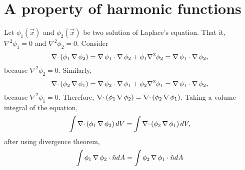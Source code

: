 \section{A property of harmonic functions}\label{c2sa11}
Let $\phi_1(\vec{x})$ and $\phi_2(\vec{x})$ be two solution of Laplace's equation. That it, $\nabla^2\phi_1 = 0$ and $\nabla^2\phi_2 = 0$. Consider
\[
\operatorname{\nabla\cdot}\left(\phi_1\operatorname{\nabla}\phi_2\right) = \operatorname{\nabla}\phi_1\cdot\operatorname{\nabla}\phi_2 + \phi_1\nabla^2\phi_2 = \operatorname{\nabla}\phi_1\cdot\operatorname{\nabla}\phi_2,
\]
because $\nabla^2\phi_2 = 0$. Similarly,
\[
\operatorname{\nabla\cdot}\left(\phi_2\operatorname{\nabla}\phi_1\right) = \operatorname{\nabla}\phi_2\cdot\operatorname{\nabla}\phi_1 + \phi_2\nabla^2\phi_1 = \operatorname{\nabla}\phi_1\cdot\operatorname{\nabla}\phi_2,
\]
because $\nabla^2\phi_1 = 0$. Therefore, $\operatorname{\nabla\cdot}\left(\phi_1\operatorname{\nabla}\phi_2\right) = \operatorname{\nabla\cdot}\left(\phi_2\operatorname{\nabla}\phi_1\right)$. Taking a volume integral of the equation,
\[
\int\operatorname{\nabla\cdot}\left(\phi_1\operatorname{\nabla}\phi_2\right)dV = \int\operatorname{\nabla\cdot}\left(\phi_2\operatorname{\nabla}\phi_1\right)dV,
\]
after using divergence theorem,
\begin{equation}\label{c2sa11e1}
\int\phi_1\operatorname{\nabla}\phi_2\cdot\hat{n} dA = \int\phi_2\operatorname{\nabla}\phi_1\cdot\hat{n} dA
\end{equation}

